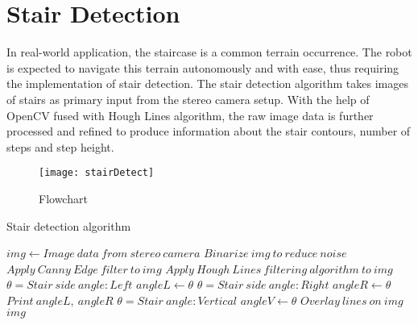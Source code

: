 \section{Stair Detection}

In real-world application, the staircase is a common terrain occurrence. The robot is expected to navigate this terrain autonomously and with ease, thus requiring the implementation of stair detection. The stair detection algorithm takes images of stairs as primary input from the stereo camera setup. With the help of OpenCV fused with Hough Lines algorithm, the raw image data is further processed and refined to produce information about the stair contours, number of steps and step height.\\

\begin{figure}
    \centering
    \texttt{[image: stairDetect]}
    \caption{Flowchart}
    \label{fig:stairDetectionFlowchart}
\end{figure}

\begin{algorithm}[hbt!]
    \caption{Stair detection algorithm}\label{alg:cap}
    
    \begin{algorithmic}[1]
    
        \Require $img \gets Image\ data\ from\ stereo\ camera$
        \State $Binarize\ img\ to\ reduce\ noise$
        \State $Apply\ Canny\ Edge\ filter\ to\ img$
        \State $Apply\ Hough\ Lines\ filtering\ algorithm\ to\ img$
            \State $\theta =Stair\ side\ angle:Left$
            \State $angleL \gets \theta$
            \State $\theta = Stair\ side\ angle:Right$
            \State $angleR \gets \theta$
        \EndIf
        \State $Print\ angleL,\ angleR$
            \State $\theta =Stair\ angle: Vertical $
            \State $angleV \gets \theta$
        \EndIf
        \State $Overlay\ lines\ on\ img$
        \\
        \Return $img$
        
    \end{algorithmic}
\end{algorithm}